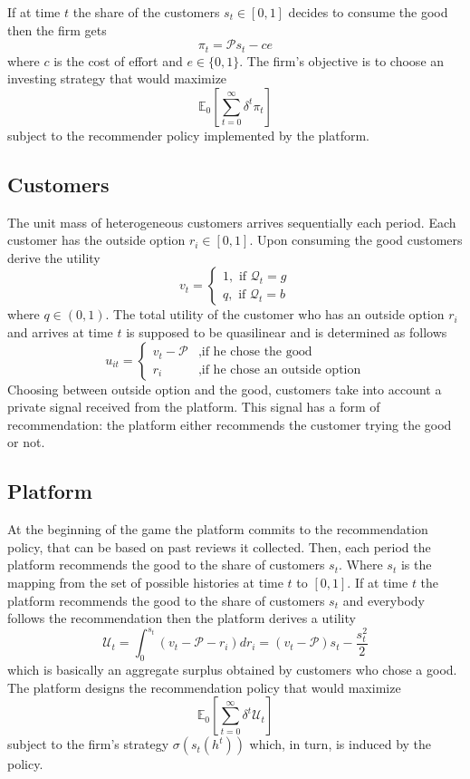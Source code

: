 \documentclass[a4paper]{article}
\newcommand{\expect}{\mathbb{E}}
\begin{document}
	
	
	If at time $t$ the share of the customers $s_t \in [0, 1]$ decides to consume the good then the firm gets $$\pi_t = \mathcal{P} s_t - ce$$ where $c$ is the cost of effort and $e \in \{0, 1\}$. The firm's objective is to choose an investing strategy that would maximize $$\expect_0\left[\sum_{t=0}^{\infty} \delta^t \pi_t \right]$$ subject to the recommender policy implemented by the platform.
	\subsection{Customers}
	
	
	The unit mass of heterogeneous customers arrives sequentially each period. Each customer has the outside option $r_i \in [0, 1]$. Upon consuming the good customers derive the utility $$v_t = \begin{cases}
	1, \text{ if }\mathcal{Q}_t = g\\
	q, \text{ if }\mathcal{Q}_t = b
	\end{cases}$$
	where $q \in (0, 1)$. The total utility of the customer who has an outside option $r_i$ and arrives at time $t$ is supposed to be quasilinear and is determined as follows $$u_{it} = \begin{cases}
	v_t - \mathcal{P}&,\text{if he chose the good}\\
	r_{i} &,\text{if he chose an outside option}
	\end{cases}$$
	Choosing between outside option and the good, customers take into account a private signal received from the platform. This signal has a form of recommendation: the platform either recommends the customer trying the good or not. 
	\subsection{Platform}
	At the beginning of the game the platform commits to the recommendation policy, that can be based on past reviews it collected. Then, each period the platform recommends the good to the share of customers $s_t$. Where $s_t$ is the mapping from the set of possible histories at time $t$ to $[0, 1]$. If at time $t$ the platform recommends the good to the share of customers $s_t$ and everybody follows the recommendation then the platform derives a utility $$\mathcal{U}_t = \int_{0}^{s_t} (v_t - \mathcal{P} - r_i)dr_i =  (v_t - \mathcal{P})s_t - \frac{s_t^2}{2}$$ which is basically an aggregate surplus obtained by customers who chose a good. The platform designs the recommendation policy that would maximize $$\expect_0\left[\sum_{t=0}^{\infty} \delta^t \mathcal{U}_t\right]$$ subject to the firm's strategy $\sigma(s_t(h^t))$ which, in turn, is induced by the policy.
\end{document}
